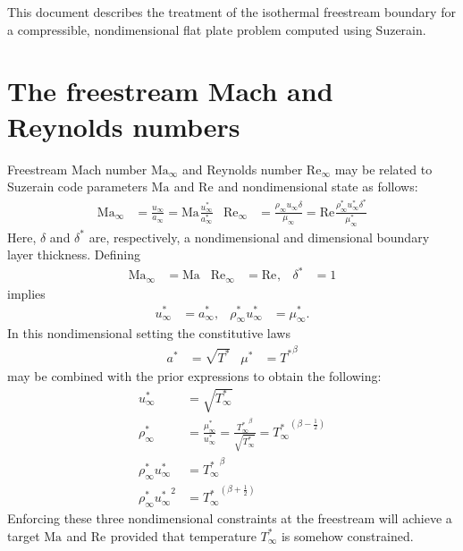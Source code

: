 \documentclass[letterpaper,11pt,nointlimits,reqno]{amsart}
\newcommand{\Mach}[1][]{\ensuremath{\mbox{Ma}_{#1}}}
\newcommand{\Reynolds}[1][]{\ensuremath{\mbox{Re}_{#1}}}
\begin{document}
This document describes the treatment of the isothermal freestream boundary for
a compressible, nondimensional flat plate problem computed using Suzerain.

\section{The freestream Mach and Reynolds numbers}


Freestream Mach number $\Mach[\infty]$ and Reynolds number $\Reynolds[\infty]$
may be related to Suzerain code parameters $\Mach$ and $\Reynolds$ and
nondimensional state as follows:
\begin{align}
  \Mach[\infty]{}
  &=         \frac{u_\infty     }{a_\infty     }
   = \Mach{} \frac{u_\infty^\ast}{a_\infty^\ast}
&
  \Reynolds[\infty]{}
  &=             \frac{\rho_\infty      u_\infty      \delta     }
                      {\mu_\infty     }
   = \Reynolds{} \frac{\rho_\infty^\ast u_\infty^\ast \delta^\ast}
                      {\mu_\infty^\ast}
\end{align}
Here, $\delta$ and $\delta^\ast$ are, respectively, a nondimensional and
dimensional boundary layer thickness.
Defining
\begin{align}
  \Mach[\infty]{} &= \Mach
& \Reynolds[\infty]{} &= \Reynolds,
& \delta^\ast &= 1
\end{align}
implies
\begin{align}
  u_\infty^\ast   &= a_\infty^\ast,
&
  \rho_\infty^\ast u_\infty^\ast &= \mu_\infty^\ast
.
\end{align}
In this nondimensional setting the constitutive laws
\begin{align}
  a^\ast &= \sqrt{T^\ast}
&\mu^\ast &= {T^\ast}^\beta
\end{align}
may be combined with the prior expressions to obtain the following:
\begin{align}
  \label{eq:u_target}
  u_\infty^\ast &= \sqrt{T_\infty^\ast}
\\
  \label{eq:rho_target}
  \rho_\infty^\ast &= \frac{\mu_\infty^\ast}{u_\infty^\ast}
                    = \frac{{T_\infty^\ast}^\beta}{\sqrt{T_\infty^\ast}}
                    = {T_\infty^\ast}^{\left(\beta-\frac{1}{2}\right)}
\\
  \label{eq:mx_target}
  \rho_\infty^\ast u_\infty^\ast &= {T_\infty^\ast}^\beta
\\
  \label{eq:ke_target}
  \rho_\infty^\ast {u_\infty^\ast}^2
&=
  {T_\infty^\ast}^{\left(\beta + \frac{1}{2}\right)}
\end{align}
Enforcing these three nondimensional constraints at the freestream will achieve
a target $\Mach$ and $\Reynolds$ provided that temperature $T_\infty^\ast$ is
somehow constrained.
\end{document}

